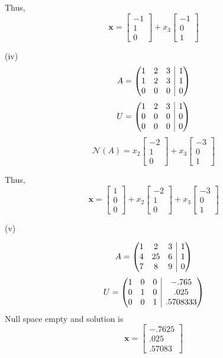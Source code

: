 \documentclass[letterpaper,12pt]{article}
\makeatletter
\theoremstyle{definition}
\newenvironment{amatrix}[1]{%
\left(\begin{array}{@{}*{#1}{c}|c@{}}
}{%
    \end{array}\right)
    }
\makeatother
\begin{document}
Thus,
\[
\mathbf{x} = \begin{bmatrix}
    -1\\1\\0
\end{bmatrix}
+
x_3
\begin{bmatrix}
    -1\\0\\1
\end{bmatrix}
\]

(iv)
\[A =
\begin{amatrix}{3}
    1 & 2 & 3 & 1\\
    1 & 2 & 3 & 1\\
    0 & 0 & 0 & 0\\
\end{amatrix}
\]
\[U =
\begin{amatrix}{3}
    1 & 2 & 3 & 1\\
    0 & 0 & 0 & 0\\
    0 & 0 & 0 & 0\\
\end{amatrix}
\]
\[ \mathscr{N} (A) = x_2
\begin{bmatrix}
    -2 \\
    1\\
    0
\end{bmatrix}
+x_3
\begin{bmatrix}
    -3 \\
    0\\
    1
\end{bmatrix}
\]

Thus,
\[
\mathbf{x} = \begin{bmatrix} 1 \\ 0 \\ 0 \end{bmatrix} + x_2
\begin{bmatrix}
    -2 \\
    1\\
    0
\end{bmatrix}
+x_3
\begin{bmatrix}
    -3 \\
    0\\
    1
\end{bmatrix}
\]

(v)

\[A =
\begin{amatrix}{3}
    1 & 2 & 3 & 1\\
    4 & 25 & 6 & 1\\
    7 & 8 & 9 & 0\\
\end{amatrix}
\]
\[U =
\begin{amatrix}{3}
    1 & 0 & 0 & -.765\\
    0 & 1 & 0 & .025\\
    0 & 0 & 1 & .5708333\\
\end{amatrix}
\]
Null space empty and solution is
\[\mathbf{x} =
\begin{bmatrix}
    -.7625\\
    .025\\
    .57083
\end{bmatrix}\]
\end{document}
